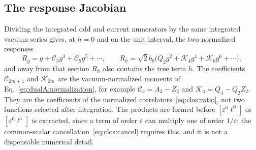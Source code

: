 \documentclass[11pt,a4paper]{article}
\numberwithin{equation}{section}
\begin{document}
\subsection{The response Jacobian}\label{app:clos:jacobian}
Dividing the integrated odd and current numerators by the same integrated vacuum series gives, at $h=0$ and on the unit
interval, the two normalized responses
\begin{equation}
 R_g=g+\mathcal C_3g^3+\mathcal C_5g^5+\cdots,\qquad
 R_h=\sqrt2b_0\bigl(Q_2g^2+\mathcal K_4g^4+\mathcal K_6g^6+\cdots\bigr),
\end{equation}
and away from that section $R_h$ also contains the tree term $h$. The coefficients $\mathcal C_{2m+1}$ and
$\mathcal K_{2m}$ are the vacuum-normalized moments of Eq.~\eqref{eq:dualA:normalization}, for example
$\mathcal C_3=A_3-Z_2$ and $\mathcal K_4=Q_4-Q_2Z_2$. They are the coefficients of the normalized
correlators~\eqref{eq:clos:ratio}, not two functions selected after integration. The products are formed before
$[\varepsilon^0\ell^0]$ or $[\varepsilon^0\ell^1]$ is extracted, since a term of order $\varepsilon$ can multiply one of
order $1/\varepsilon$; the common-scalar cancellation~\eqref{eq:clos:cancel} requires this, and it is not a dispensable
numerical detail.
\end{document}
